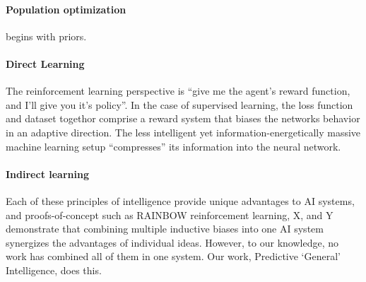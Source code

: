 \paragraph{Population optimization} begins with priors. 

\paragraph{Direct Learning} 

The reinforcement learning perspective is ``give me the agent's reward function, and I'll give you it's policy''. In the case of supervised learning, the loss function and dataset togethor comprise a reward system that biases the networks behavior in an adaptive direction. The less intelligent yet information-energetically massive machine learning setup ``compresses'' its information into the neural network.

\paragraph{Indirect learning} 

    
Each of these principles of intelligence provide unique advantages to AI systems, and proofs-of-concept such as RAINBOW reinforcement learning, X, and Y demonstrate that combining multiple inductive biases into one AI system synergizes the advantages of individual ideas. However, to our knowledge, no work has combined all of them in one system. Our work, Predictive ‘General’ Intelligence, does this. 
